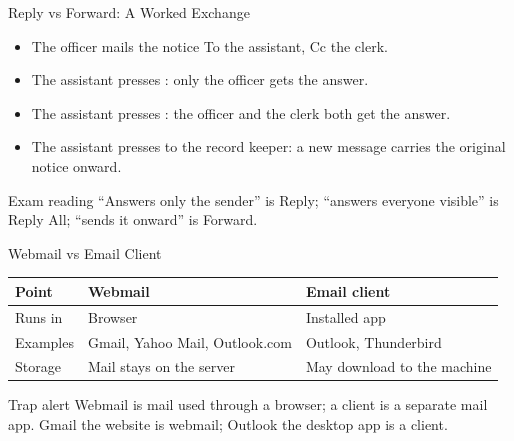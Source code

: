 \documentclass[aspectratio=169]{beamer}
\begin{document}
\begin{frame}{Reply vs Forward: A Worked Exchange}
  \begin{itemize}
    \item The officer mails the notice To the assistant, Cc the clerk.
    \item The assistant presses : only the officer gets the answer.
    \item The assistant presses : the officer and the clerk
      both get the answer.
    \item The assistant presses  to the record keeper: a new
      message carries the original notice onward.
  \end{itemize}
  \begin{exampleblock}{Exam reading}
    ``Answers only the sender'' is Reply; ``answers everyone visible'' is
    Reply All; ``sends it onward'' is Forward.
  \end{exampleblock}
\end{frame}

\begin{frame}{Webmail vs Email Client}
  \begin{center}
    \begin{tabular}{lll}
      \toprule
      \textbf{Point} & \textbf{Webmail} & \textbf{Email client} \\
      \midrule
      Runs in & Browser & Installed app \\
      Examples & Gmail, Yahoo Mail, Outlook.com & Outlook, Thunderbird \\
      Storage & Mail stays on the server & May download to the machine \\
      \bottomrule
    \end{tabular}
  \end{center}
  \vspace{0.3cm}
  \begin{alertblock}{Trap alert}
    Webmail is mail used through a browser; a client is a separate mail app.
    Gmail the website is webmail; Outlook the desktop app is a client.
  \end{alertblock}
\end{frame}
\end{document}
